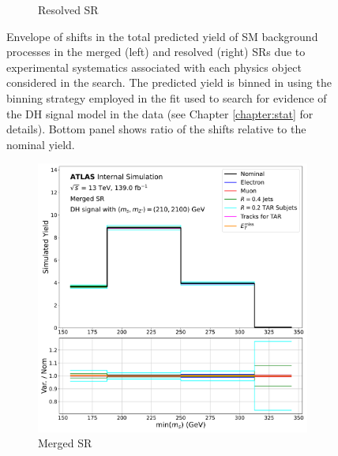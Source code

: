 \begin{figure}[htbp]
\begin{subfigure}[t]{0.48\textwidth}
     \caption{Resolved SR}
    \end{subfigure}
    \caption{Envelope of shifts in the total predicted yield of SM background processes in the merged (left) and resolved (right) SRs due to experimental systematics associated with each physics object considered in the search. The predicted yield is binned in \minms using the binning strategy employed in the fit used to search for evidence of the DH signal model in the data (see Chapter \ref{chapter:stat} for details). Bottom panel shows ratio of the shifts relative to the nominal yield.}
   \label{fig:exp_syst_shifts_bkg}
\end{figure}

\begin{figure}[htbp]
  \centering
    \begin{subfigure}[t]{0.48\textwidth}
    \centering
     \includegraphics[width = 0.99\textwidth]{Figures/6/exp_systs_monoSWWsemilep_zp2100_dm200_dh210_SR_mgd_TARJets10_minmS_mgd.pdf}
    \caption{Merged SR}
    \end{subfigure}
    \begin{subfigure}[t]{0.48\textwidth}
    \centering

\end{subfigure}
\end{figure}
